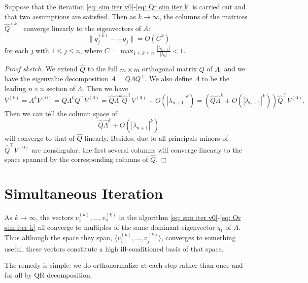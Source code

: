  
 \begin{theorem}
 \label{thm: covergence simultaneous iteration}
 Suppose that the iteration \eqref{eq: sim iter v0}-\eqref{eq: Qr sim iter k}  is carried out and that two assumptions are satisfied. Then as $k\to \infty$, the columns of the matrices $\hat Q^{(k)}$ converge linearly to the eigenvectors of $A$: 
 \begin{equation}
 \label{eq: convergence simulataneous iteration}
    \|q_j^{(k)} -\pm q_j\| = O(C^{k})
 \end{equation}
 for each $j$ with $1\le j \le n$, where $C = \max_{1\le k\le n } \frac{|\lambda _{k+1}|}{|\lambda _k|} <1$. 
 \end{theorem}
 
\begin{proof}[Proof sketch]
We extend $\hat Q$ to the full $m\times m$ orthogonal matrix $Q$ of $A$, and we have the eigenvalue decomposition $A = Q\Lambda Q^\top $. We also define $\hat \Lambda $ to be the leading $n\times n$ section of $\Lambda $. Then we have 
\[
    V^{(k)} = A^{k}V^{(0)} = Q\Lambda ^{k}Q^\top V^{(0)} = \hat Q \hat \Lambda  ^{k} \hat Q ^\top  V^{(0)} + O(|\lambda_{n+1}|^k) = (\hat Q \hat \Lambda ^{k} + O(|\lambda _{n+1} | ^{k})) \hat Q ^\top  V^{(0)}. 
\]
Then we can tell the column space of 
\[
    \hat Q \hat \Lambda ^k  + O(|\lambda _{n+1}|^k) 
\]
will converge to that of $\hat Q$ linearly. Besides, due to all principals minors of $\hat Q^\top  V^{(0)}$ are nonsingular, the first several columns will converge linearly to the space spanned by the corresponding columns of $\hat Q$. 
\end{proof}


\section{Simultaneous Iteration} 
As $k\to \infty$, the vectors $ v_1^{(k)}, \ldots ,v_n^{(k)} $ in the algorithm \eqref{eq: sim iter v0}-\eqref{eq: Qr sim iter k} all converge to multiples of the same dominant eigenvector $q_1$ of $A$. Thus although the space they span, $ \langle v_1^{(k)},\ldots ,v_j^{(k)} \rangle  $, converges to something useful, these vectors constitute a high ill-conditioned basis of that space. 

The remedy is simple: we do orthonormalize at each step rather than once and for all by QR decomposition. 

